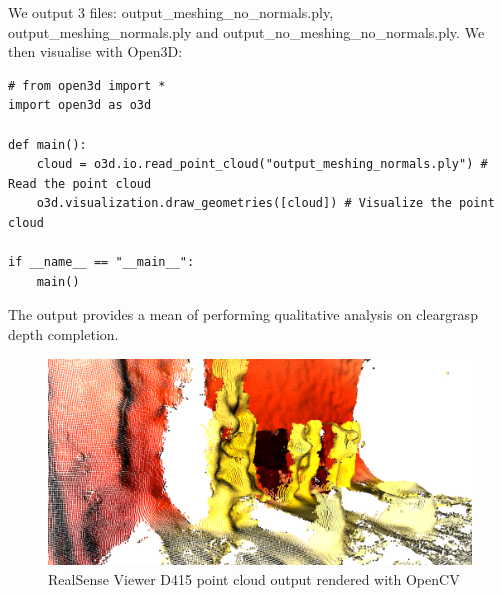 We output 3 files: output\_meshing\_no\_normals.ply, output\_meshing\_normals.ply and output\_no\_meshing\_no\_normals.ply. We then visualise with Open3D:
\begin{verbatim}
# from open3d import *    
import open3d as o3d

def main():
    cloud = o3d.io.read_point_cloud("output_meshing_normals.ply") # Read the point cloud
    o3d.visualization.draw_geometries([cloud]) # Visualize the point cloud     

if __name__ == "__main__":
    main()
\end{verbatim}
The output provides a mean of performing qualitative analysis on cleargrasp depth completion.
\begin{figure}[h!]
\centering
\includegraphics[width=\textwidth]{Figures/OpenCV-point-cloud-import-2.png}
\caption{RealSense Viewer D415 point cloud output rendered with OpenCV}
\label{fig:realsenseOutputForReport}
\end{figure}




